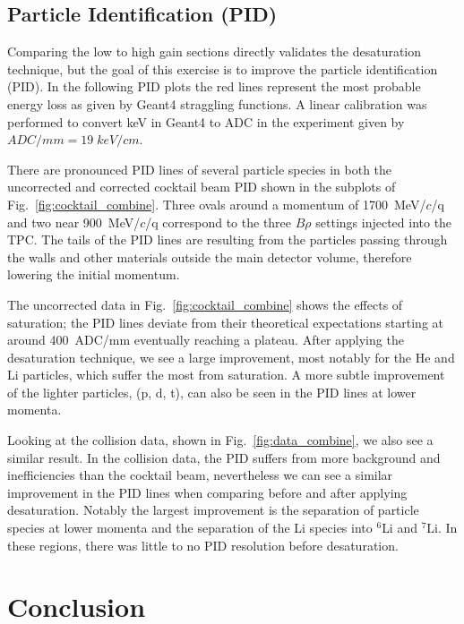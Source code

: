 \documentclass[review]{elsarticle}
\begin{document}
\subsection{Particle Identification (PID)}


Comparing the low to high gain sections directly validates the desaturation technique, but the goal  of this exercise is to improve the particle identification (PID). In the following PID plots the red lines represent the most probable energy loss as given by Geant4 straggling functions. A linear calibration was performed to convert keV in Geant4 to ADC in the experiment given by $ADC/mm = 19\;keV/cm$.

There are pronounced PID lines of several particle species in both the uncorrected and corrected cocktail beam PID shown in the subplots of Fig.~\ref{fig:cocktail_combine}. Three ovals around a momentum of 1700~MeV/$c$/q and two near 900~MeV/$c$/q correspond to the three $B\rho$ settings injected into the TPC. The tails of the PID lines are resulting from the particles passing through the walls and other materials outside the main detector volume, therefore lowering the initial momentum. 

The uncorrected data in Fig.~\ref{fig:cocktail_combine} shows the effects of saturation; the PID lines deviate from their theoretical expectations starting at around 400~ADC/mm eventually reaching a plateau. After applying the desaturation technique, we see a large improvement, most notably for the He and Li particles, which suffer the most from saturation. A more subtle improvement of the lighter particles, (p, d, t), can also be seen in the PID lines at lower momenta.

Looking at the collision data, shown in Fig.~\ref{fig:data_combine}, we also see a similar result. In the collision data, the PID suffers from more background and inefficiencies than the cocktail beam, nevertheless we can see a similar improvement in the PID lines when comparing before and after applying desaturation. Notably the largest improvement is the separation of particle species at lower momenta and the separation of the Li species into ${}^{6}$Li and ${}^{7}$Li. In these regions, there was little to no PID resolution before desaturation. 

\clearpage

\section{Conclusion}
\end{document}
